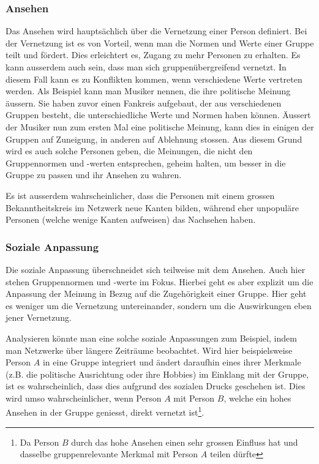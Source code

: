 \subsubsection{Ansehen}
Das Ansehen wird hauptsächlich über die Vernetzung einer Person definiert. Bei der Vernetzung ist es von Vorteil, wenn
man die Normen und Werte einer Gruppe teilt und fördert. Dies erleichtert es, Zugang zu mehr Personen zu erhalten. Es
kann ausserdem auch sein, dass man sich gruppenübergreifend vernetzt. In diesem Fall kann es zu Konflikten kommen, wenn
verschiedene Werte vertreten werden. Als Beispiel kann man Musiker nennen, die ihre politische Meinung äussern. Sie
haben zuvor einen Fankreis aufgebaut, der aus verschiedenen Gruppen besteht, die unterschiedliche Werte und Normen
haben können. Äussert der Musiker nun zum ersten Mal eine politische Meinung, kann dies in einigen der Gruppen auf
Zuneigung, in anderen auf Ablehnung stossen. Aus diesem Grund wird es auch solche Personen geben, die Meinungen, die
nicht den Gruppennormen und -werten entsprechen, geheim halten, um besser in die Gruppe zu passen und ihr Ansehen zu wahren.

Es ist ausserdem wahrscheinlicher, dass die Personen mit einem grossen Bekanntheitskreis im Netzwerk neue Kanten bilden, während eher
unpopuläre Personen (welche wenige Kanten aufweisen) das Nachsehen haben.

\subsubsection{Soziale Anpassung}
Die soziale Anpassung überschneidet sich teilweise mit dem Ansehen. Auch hier stehen Gruppennormen und -werte im Fokus. Hierbei
geht es aber explizit um die Anpassung der Meinung in Bezug auf die Zugehörigkeit einer Gruppe. Hier geht es weniger
um die Vernetzung untereinander, sondern um die Auswirkungen eben jener Vernetzung.

Analysieren könnte man eine solche soziale Anpassungen zum Beispiel, indem man Netzwerke über längere Zeiträume
beobachtet. Wird hier beispielsweise Person $A$ in eine Gruppe integriert und ändert daraufhin eines ihrer Merkmale
(z.B. die politische Ausrichtung oder ihre Hobbies) im Einklang mit der Gruppe, ist es
wahrscheinlich, dass dies aufgrund des sozialen Drucks geschehen ist.
Dies wird umso wahrscheinlicher, wenn Person $A$ mit Person $B$,
welche ein hohes Ansehen in der Gruppe geniesst, direkt vernetzt ist\footnote{Da Person $B$ durch das hohe Ansehen einen sehr grossen Einfluss hat und dasselbe
gruppenrelevante Merkmal mit Person $A$ teilen dürfte}.

